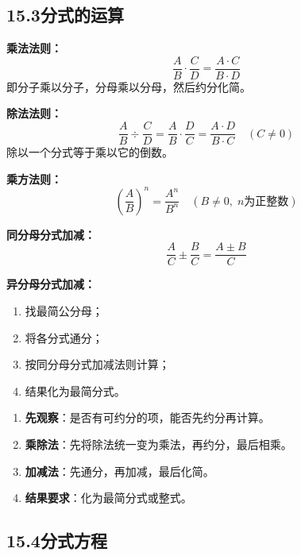 \documentclass[12pt, a4paper]{ctexart}
\begin{document}
\subsection*{15.3\quad 分式的运算}

\begin{knowledgebox}[分式的乘除法]
\textbf{乘法法则：}
\[
\frac{A}{B} \cdot \frac{C}{D} = \frac{A \cdot C}{B \cdot D}
\]
即分子乘以分子，分母乘以分母，然后约分化简。

\medskip
\textbf{除法法则：}
\[
\frac{A}{B} \div \frac{C}{D} = \frac{A}{B} \cdot \frac{D}{C} = \frac{A \cdot D}{B \cdot C} \quad (C \neq 0)
\]
除以一个分式等于乘以它的倒数。

\medskip
\textbf{乘方法则：}
\[
\left(\frac{A}{B}\right)^n = \frac{A^n}{B^n} \quad (B \neq 0,\; n\text{为正整数})
\]
\end{knowledgebox}

\begin{knowledgebox}[分式的加减法]
\textbf{同分母分式加减：}
\[
\frac{A}{C} \pm \frac{B}{C} = \frac{A \pm B}{C}
\]

\medskip
\textbf{异分母分式加减：}
\begin{enumerate}[leftmargin=2em]
  \item 找最简公分母；
  \item 将各分式通分；
  \item 按同分母分式加减法则计算；
  \item 结果化为最简分式。
\end{enumerate}
\end{knowledgebox}

\begin{tipbox}[分式运算的一般步骤]
\begin{enumerate}[leftmargin=2em]
  \item \textbf{先观察}：是否有可约分的项，能否先约分再计算。
  \item \textbf{乘除法}：先将除法统一变为乘法，再约分，最后相乘。
  \item \textbf{加减法}：先通分，再加减，最后化简。
  \item \textbf{结果要求}：化为最简分式或整式。
\end{enumerate}
\end{tipbox}

\subsection*{15.4\quad 分式方程}
\end{document}
